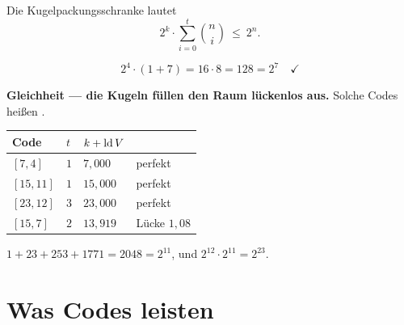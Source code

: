 \begin{merksatz}
Die Kugelpackungsschranke lautet
\[ 2^{k}\cdot\sum_{i=0}^{t}\binom{n}{i} \ \le\ 2^{n} . \]

\[ 2^{4}\cdot(1+7) = 16\cdot8 = 128 = 2^{7} \quad \checkmark \]

\begin{center}
\begin{minipage}{0.9\textwidth}
\textbf{Gleichheit --- die Kugeln füllen den Raum lückenlos aus.} Solche Codes heißen .
\end{minipage}
\end{center}

\begin{center}
{\small
\renewcommand{\arraystretch}{1.48}
\begin{tabular}{@{}P{2.2cm}P{1.4cm}P{2.2cm}P{2.0cm}@{}}
\toprule
\textbf{Code} & $t$ & $k+\operatorname{ld} V$ & \\
\midrule
$[7,4]$ & $1$ & $7{,}000$ & \textcolor{gruen}{perfekt}\\
$[15,11]$ & $1$ & $15{,}000$ & \textcolor{gruen}{perfekt}\\
$[23,12]$ & $3$ & $23{,}000$ & \textcolor{gruen}{perfekt}\\
$[15,7]$ & $2$ & $13{,}919$ & Lücke $1{,}08$\\
\bottomrule
\end{tabular}}
\end{center}

 $1+23+253+1771 = 2048 = 2^{11}$, und $2^{12}\cdot2^{11} = 2^{23}$.

\begin{center}
\begin{minipage}{0.88\textwidth}
\end{minipage}
\end{center}
\end{merksatz}

\section{Was Codes leisten}

